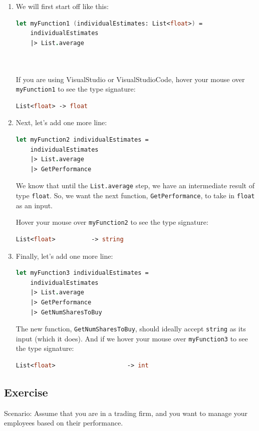 \documentclass[12pt]{article}
\begin{document}
\begin{enumerate}
\item We will first start off like this:
\begin{lstlisting}[language=FSharp]
let myFunction1 (individualEstimates: List<float>) =
    individualEstimates                 
    |> List.average     

  
\end{lstlisting}
If you are using VisualStudio or VisualStudioCode, hover your mouse over \texttt{myFunction1} to see the type signature:
\begin{lstlisting}[language=FSharp]
List<float> -> float
\end{lstlisting}
\item Next, let's add one more line:
\begin{lstlisting}[language=FSharp]
let myFunction2 individualEstimates =
    individualEstimates                 
    |> List.average                     
    |> GetPerformance         
\end{lstlisting}
We know that until the \texttt{List.average} step, we have an intermediate result of type \texttt{float}. So, we want the next function, \texttt{GetPerformance}, to take in \texttt{float} as an input. 

Hover your mouse over \texttt{myFunction2} to see the type signature:
\begin{lstlisting}[language=FSharp]
List<float>          -> string
\end{lstlisting}
\item Finally, let's add one more line:
\begin{lstlisting}[language=FSharp]
let myFunction3 individualEstimates =
    individualEstimates                 
    |> List.average                     
    |> GetPerformance                
    |> GetNumSharesToBuy     
\end{lstlisting}
The new function, \texttt{GetNumSharesToBuy}, should ideally accept \texttt{string} as its input (which it does). And if we hover your mouse over \texttt{myFunction3} to see the type signature:
\begin{lstlisting}[language=FSharp]
List<float>                    -> int
\end{lstlisting}
\end{enumerate}

\pagebreak
\subsection{Exercise}
Scenario: Assume that you are in a trading firm, and you want to manage your employees based on their performance.
\end{document}
